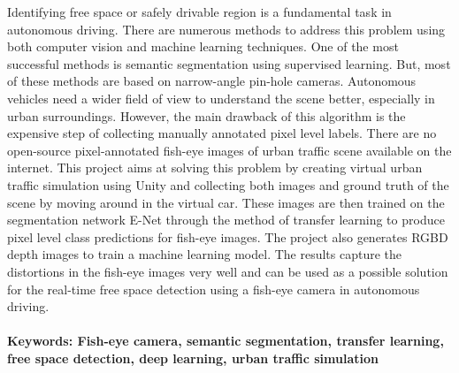 \documentclass[a4paper, 12pt, oneside, BCOR1cm,toc=chapterentrywithdots]{scrbook}
\renewcommand*{\tableofcontents}{%
  	\begingroup
  	\tocsection
  	\tocfile{\contentsname}{toc}
  	\endgroup
}
\renewcommand*{\listoffigures}{%
  	\begingroup
  	\tocsection
  	\tocfile{\listfigurename}{lof}
  	\endgroup
}
\renewcommand{\listoftables}{
	\begingroup
	\tocsection
	\tocfile{\listtablename}{lot}
	\endgroup
}
\begin{document}

Identifying free space or safely drivable region is a fundamental task in autonomous driving. There are numerous methods to address this problem using both  computer vision and machine learning techniques. One of the most successful methods is semantic segmentation using supervised learning. But, most of these methods are based on narrow-angle pin-hole cameras. Autonomous vehicles need a wider field of view to understand the scene better, especially in urban surroundings.  However, the main drawback of this algorithm is the expensive step of collecting manually annotated pixel level labels. There are no open-source pixel-annotated fish-eye images of urban traffic scene available on the internet. This project aims at solving this problem by creating virtual urban traffic simulation using Unity and collecting both images and ground truth of the scene by moving around in the virtual car. These images are then trained on the segmentation network E-Net through the method of transfer learning to produce pixel level class predictions for fish-eye images. The project also generates RGBD depth images to train a machine learning model. The results capture the distortions in the fish-eye images very well and can be used as a possible solution for the real-time free space detection using a fish-eye camera in autonomous driving.
\\\\
\textbf{Keywords: Fish-eye camera, semantic segmentation, transfer learning, free space detection, deep learning, urban traffic simulation}


\tableofcontents
\listoffigures
\listoftables

\twocolumn
{}
\begin{acronym}[Bash]


\end{acronym}
\end{document}

